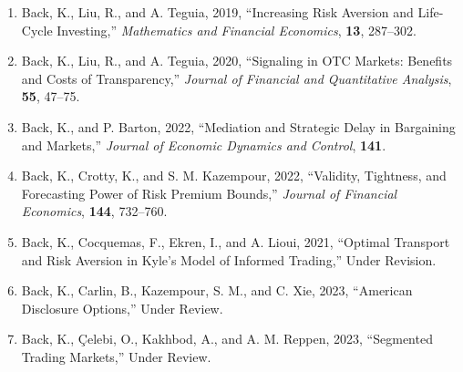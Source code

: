 \documentclass[11pt]{article}
\begin{document}
\begin{enumerate}
\item Back, K., Liu, R., and A. Teguia, 2019, ``Increasing Risk Aversion and Life-Cycle Investing,'' \textit{Mathematics and Financial Economics}, \textbf{13}, 287--302.
\item Back, K., Liu, R., and A. Teguia, 2020, ``Signaling in OTC Markets: Benefits and Costs of Transparency,'' \textit{Journal of Financial and Quantitative Analysis}, \textbf{55}, 47--75.
\item Back, K., and P. Barton, 2022, ``Mediation and Strategic Delay in Bargaining and Markets,'' \textit{Journal of Economic Dynamics and Control}, \textbf{141}.
\item Back, K., Crotty, K., and S. M. Kazempour, 2022, ``Validity, Tightness, and Forecasting Power of Risk Premium Bounds,''  \textit{Journal of Financial Economics}, \textbf{144}, 732--760.
    \item Back, K., Cocquemas, F., Ekren, I., and A. Lioui, 2021, ``Optimal Transport and Risk Aversion in Kyle's Model of Informed Trading,'' Under Revision.
\item Back, K., Carlin, B., Kazempour, S. M., and C. Xie, 2023, ``American Disclosure Options,'' Under Review.
\item Back, K., \c{C}elebi, O., Kakhbod, A., and A. M. Reppen, 2023, ``Segmented Trading Markets,'' Under Review.
\end{enumerate}
\end{document}
